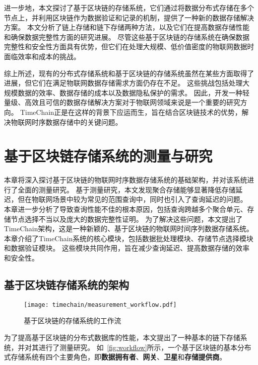 进一步地，本文探讨了基于区块链的存储系统，它们通过将数据分布式存储在多个节点上，并利用区块链作为数据验证和记录的机制，提供了一种新的数据存储解决方案。
本文分析了链上存储和链下存储两种方法，以及它们在提高数据存储性能和确保数据完整性方面的研究进展。
尽管这些基于区块链的存储系统在确保数据完整性和安全性方面具有优势，但它们在处理大规模、低价值密度的物联网数据时面临效率和成本的挑战。

综上所述，现有的分布式存储系统和基于区块链的存储系统虽然在某些方面取得了进展，但它们在满足物联网数据存储需求方面仍存在不足。
这些挑战包括处理大规模数据的效率、数据存储的成本以及数据隐私保护的需求。
因此，开发一种轻量级、高效且可信的数据存储解决方案对于物联网领域来说是一个重要的研究方向。
TimeChain正是在这样的背景下应运而生，旨在结合区块链技术的优势，解决物联网时序数据存储中的关键问题。

\chapter{基于区块链存储系统的测量与研究}
\label{sec:baseline}
本章将深入探讨基于区块链的物联网时序数据存储系统的基础架构，并对该系统进行了全面的测量研究。
基于测量研究，本文发现聚合存储能够显著降低存储延迟，但在物联网场景中较为常见的范围查询中，同时也引入了查询延迟的问题。
本章进一步分析了导致查询性能不佳的根本原因，包括查询跨越多个聚合单元、存储节点选择不当以及庞大的数据完整性证明。
为了解决这些问题，本文提出了TimeChain架构，这是一种新颖的、基于区块链的物联网时间序列数据存储系统。
本章介绍了TimeChain系统的核心模块，包括数据批处理模块、存储节点选择模块和数据验证模块。
这些模块共同作用，旨在减少查询延迟、提高数据存储的效率和安全性。

\section{基于区块链存储系统的架构}

\begin{figure}[t]
    \centering
    \texttt{[image: timechain/measurement\_workflow.pdf]}
    \caption{基于区块链的存储系统的工作流}
    \label{fig:workflow}
\end{figure}

为了提高基于区块链的分布式数据库的性能，本文提出了一种基本的链下存储系统，并对其进行了测量研究。
如~\autoref{fig:workflow}所示，一个基于区块链的基本分布式存储系统有四个主要角色，即\textbf{数据拥有者}、\textbf{网关}、\textbf{卫星}和\textbf{存储提供商}。

